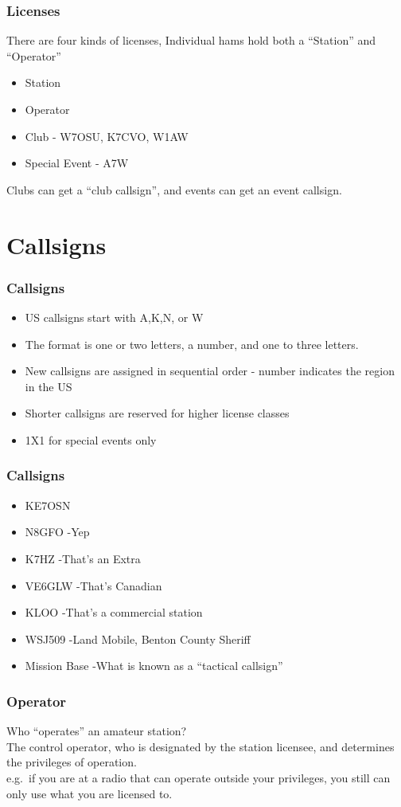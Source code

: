 \documentclass[10pt]{beamer}
\begin{document}
\begin{frame}
\frametitle{Licenses}
There are four kinds of licenses, Individual hams hold both a ``Station'' and ``Operator''
\begin{itemize}
\item Station
\item Operator
\item Club - W7OSU, K7CVO, W1AW
\item Special Event - A7W
\end{itemize}
Clubs can get a ``club callsign'', and events can get an event callsign.
\end{frame}

\section{Callsigns}

\begin{frame}
\frametitle{Callsigns}
\begin{itemize}
\item US callsigns start with A,K,N, or W
\item The format is one or two letters, a number, and one to three letters.
\item New callsigns are assigned in sequential order - number indicates the region in the US
\item Shorter callsigns are reserved for higher license classes
\item 1X1 for special events only
\end{itemize}
\end{frame}

\begin{frame}
\frametitle{Callsigns}
\begin{itemize}
\item KE7OSN
\item N8GFO -Yep\pause
\item K7HZ -That's an Extra\pause
\item VE6GLW -That's Canadian\pause
\item KLOO -That's a commercial station\pause
\item WSJ509 -Land Mobile, Benton County Sheriff\pause
\item Mission Base -What is known as a ``tactical callsign''\pause
\end{itemize}
\end{frame}

\begin{frame}
\frametitle{Operator}
Who ``operates'' an amateur station? \pause \\
The control operator, who is designated by the station licensee, and determines the privileges of operation.\\
e.g.\ if you are at a radio that can operate outside your privileges, you still can only use what you are licensed to.
\end{frame}
\end{document}

